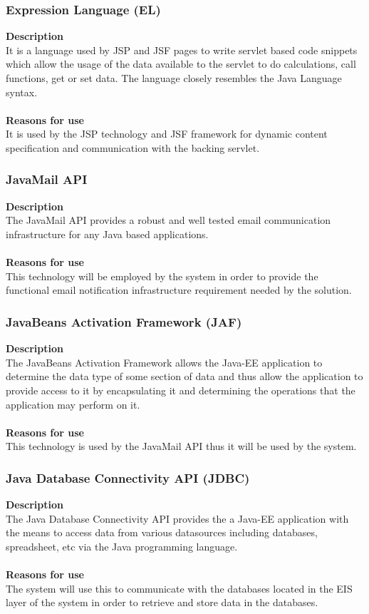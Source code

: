 \documentclass[12pt]{article}
\begin{document}
\subsubsection{Expression Language (EL)}
\textbf{Description}\\
It is a language used by JSP and JSF pages to write servlet based code snippets which allow the usage of the data available to the servlet to do calculations, call functions, get or set data. The language closely resembles the Java Language syntax.\\\\
\textbf{Reasons for use}\\
It is used by the JSP technology and JSF framework for dynamic content specification and communication with the backing servlet.

\subsubsection{JavaMail API}
\textbf{Description}\\
The JavaMail API provides a robust and well tested email communication infrastructure for any Java based applications.\\\\
\textbf{Reasons for use}\\
This technology will be employed by the system in order to provide the functional email notification infrastructure requirement needed by the solution.

\subsubsection{JavaBeans Activation Framework (JAF)}
\textbf{Description}\\
The JavaBeans Activation Framework allows the Java-EE application to determine the data type of some section of data and thus allow the application to provide access to it by encapsulating it and determining the operations that the application may perform on it.\\\\
\textbf{Reasons for use}\\
This technology is used by the JavaMail API thus it will be used by the system. 

\subsubsection{Java Database Connectivity API (JDBC)}
\textbf{Description}\\
The Java Database Connectivity API provides the a Java-EE application with the means to access data from various datasources including databases, spreadsheet, etc via the Java programming language.\\\\
\textbf{Reasons for use}\\
The system will use this to communicate with the databases located in the EIS layer of the system in order to retrieve and store data in the databases. 
\end{document}

